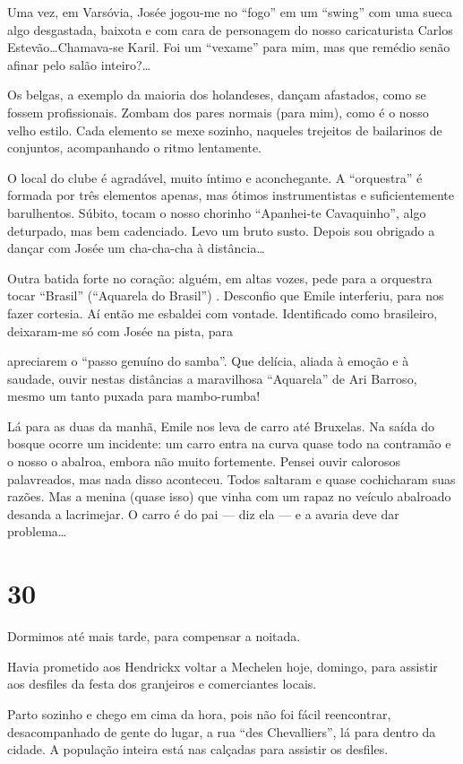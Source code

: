 Uma vez, em Varsóvia, Josée jogou-me no ``fogo'' em um ``swing'' com uma sueca algo desgastada, baixota e com cara de personagem do nosso caricaturista Carlos Estevão\ldots Chamava-se Karil. Foi um ``vexame'' para mim, mas que remédio senão afinar pelo salão inteiro?\ldots

Os belgas, a exemplo da maioria dos holandeses, dançam afastados, como se fossem profissionais. Zombam dos pares normais (para mim), como é o nosso velho estilo. Cada elemento se mexe sozinho, naqueles trejeitos de bailarinos de conjuntos, acompanhando o ritmo lentamente.

O local do clube é agradável, muito íntimo e aconchegante. A ``orquestra'' é formada por três elementos apenas, mas ótimos instrumentistas e suficientemente barulhentos. Súbito, tocam o nosso chorinho ``Apanhei-te Cavaquinho'', algo deturpado, mas bem cadenciado. Levo um bruto susto. Depois sou obrigado a dançar com Josée um cha-cha-cha à distância\ldots

Outra batida forte no coração: alguém, em altas vozes, pede para a orquestra tocar ``Brasil'' (``Aquarela do Brasil'') . Desconfio que Emile interferiu, para nos fazer cortesia. Aí então me esbaldei com vontade. Identificado como brasileiro, deixaram-me só com Josée na pista, para

apreciarem o ``passo genuíno do samba''. Que delícia, aliada à emoção e à saudade, ouvir nestas distâncias a maravilhosa ``Aquarela'' de Ari Barroso, mesmo um tanto puxada para mambo-rumba!

Lá para as duas da manhã, Emile nos leva de carro até Bruxelas. Na saída do bosque ocorre um incidente: um carro entra na curva quase todo na contramão e o nosso o abalroa, embora não muito fortemente. Pensei ouvir calorosos palavreados, mas nada disso aconteceu. Todos saltaram e quase cochicharam suas razões. Mas a menina (quase isso) que vinha com um rapaz no veículo abalroado desanda a lacrimejar. O carro é do pai --- diz ela --- e a avaria deve dar problema\ldots

\section*{30 \adfflatleafright {}}
Dormimos até mais tarde, para compensar a noitada.

Havia prometido aos Hendrickx voltar a Mechelen hoje, domingo, para assistir aos desfiles da festa dos granjeiros e comerciantes locais.

Parto sozinho e chego em cima da hora, pois não foi fácil reencontrar, desacompanhado de gente do lugar, a rua ``des Chevalliers'', lá para dentro da cidade. A população inteira está nas calçadas para assistir os desfiles.

